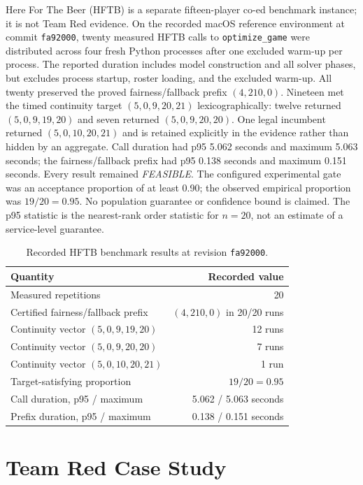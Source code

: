 \documentclass[11pt]{article}
\newcommand{\code}[1]{\texttt{#1}}
\begin{document}
Here For The Beer (HFTB) is a separate fifteen-player co-ed benchmark instance;
it is not Team Red evidence. On the recorded macOS reference environment at
commit \code{fa92000}, twenty measured HFTB calls to \code{optimize\_game}
were distributed across four fresh Python processes after one excluded warm-up
per process. The reported duration includes model construction and all solver
phases, but excludes process startup, roster loading, and the excluded warm-up.
All twenty preserved the proved fairness/fallback prefix
$(4,210,0)$. Nineteen met the timed continuity target
$(5,0,9,20,21)$ lexicographically: twelve returned $(5,0,9,19,20)$ and seven
returned $(5,0,9,20,20)$. One legal incumbent returned
$(5,0,10,20,21)$ and is retained explicitly in the evidence rather than hidden
by an aggregate. Call duration had p95 5.062 seconds and maximum 5.063 seconds;
the fairness/fallback prefix had p95 0.138 seconds and maximum 0.151 seconds.
Every result remained \emph{FEASIBLE}. The configured experimental gate was an
acceptance proportion of at least 0.90; the observed empirical proportion was
$19/20=0.95$. No population guarantee or confidence bound is claimed. The p95
statistic is the nearest-rank order statistic for $n=20$, not an estimate of a
service-level guarantee.

\begin{table}[htbp]
\centering
\caption{Recorded HFTB benchmark results at revision \code{fa92000}.}
\label{tab:hftb-results}
\small
\begin{tabular}{lr}
\toprule
Quantity & Recorded value\\
\midrule
Measured repetitions & 20\\
Certified fairness/fallback prefix & $(4,210,0)$ in 20/20 runs\\
Continuity vector $(5,0,9,19,20)$ & 12 runs\\
Continuity vector $(5,0,9,20,20)$ & 7 runs\\
Continuity vector $(5,0,10,20,21)$ & 1 run\\
Target-satisfying proportion & $19/20=0.95$\\
Call duration, p95 / maximum & 5.062 / 5.063 seconds\\
Prefix duration, p95 / maximum & 0.138 / 0.151 seconds\\
\bottomrule
\end{tabular}
\end{table}

\section{Team Red Case Study}
\end{document}

